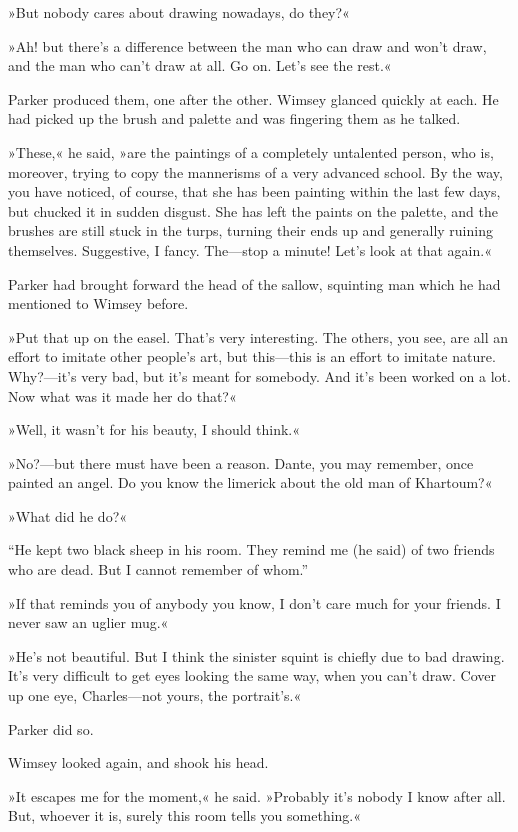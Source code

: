 »But nobody cares about drawing nowadays, do they?«

»Ah! but there's a difference between the man who can draw and won't draw, and the man who can't draw at all. Go on. Let's see the rest.«

Parker produced them, one after the other. Wimsey glanced quickly at each. He had picked up the brush and palette and was fingering them as he talked.

»These,« he said, »are the paintings of a completely untalented person, who is, moreover, trying to copy the mannerisms of a very advanced school. By the way, you have noticed, of course, that she has been painting within the last few days, but chucked it in sudden disgust. She has left the paints on the palette, and the brushes are still stuck in the turps, turning their ends up and generally ruining themselves. Suggestive, I fancy. The\allowbreak---\allowbreak stop a minute! Let's look at that again.«

Parker had brought forward the head of the sallow, squinting man which he had mentioned to Wimsey before.

»Put that up on the easel. That's very interesting. The others, you see, are all an effort to imitate other people's art, but this\allowbreak---\allowbreak this is an effort to imitate nature. Why?---it's very bad, but it's meant for somebody. And it's been worked on a lot. Now what was it made her do that?«

»Well, it wasn't for his beauty, I should think.«

»No?---but there must have been a reason. Dante, you may remember, once painted an angel. Do you know the limerick about the old man of Khartoum?«

»What did he do?«

\enquote{He kept two black sheep in his room. They remind me (he said) of two friends who are dead. But I cannot remember of whom.}

»If that reminds you of anybody you know, I don't care much for your friends. I never saw an uglier mug.«

»He's not beautiful. But I think the sinister squint is chiefly due to bad drawing. It's very difficult to get eyes looking the same way, when you can't draw. Cover up one eye, Charles\allowbreak---\allowbreak not yours, the portrait's.«

Parker did so.

Wimsey looked again, and shook his head.

»It escapes me for the moment,« he said. »Probably it's nobody I know after all. But, whoever it is, surely this room tells you something.«

